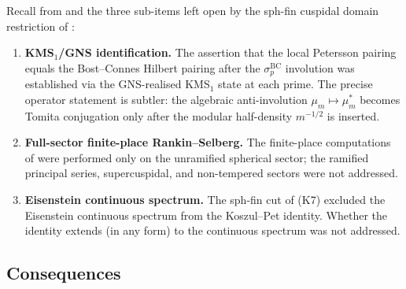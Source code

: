 Recall from  and
 the three sub-items left open
by the sph-fin cuspidal domain restriction of
:
\begin{enumerate}
\item[(I)] \textbf{KMS\({}_{1}\)/GNS identification.} The assertion
 that the local Petersson
pairing equals the Bost--Connes Hilbert pairing after the
\(\sigma^{\mathrm{BC}}_{p}\) involution was established via the
GNS-realised KMS\({}_{1}\) state at each prime. The precise
operator statement is subtler: the algebraic anti-involution
\(\mu_m\mapsto\mu_m^{*}\) becomes Tomita conjugation only after the
modular half-density \(m^{-1/2}\) is inserted.
\item[(II)] \textbf{Full-sector finite-place Rankin--Selberg.} The
finite-place computations of  were performed
only on the unramified spherical sector; the ramified principal
series, supercuspidal, and non-tempered sectors were not addressed.
\item[(III)] \textbf{Eisenstein continuous spectrum.} The sph-fin
cut of (K7) excluded the Eisenstein
continuous spectrum from the Koszul--Pet identity. Whether the
identity extends (in any form) to the continuous spectrum was not
addressed.
\end{enumerate}

\subsection{Consequences}
\label{v4-arith:kms-gns:consequences}

